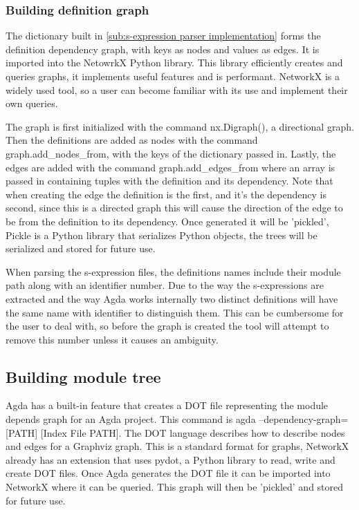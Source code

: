 \subsubsection{Building definition graph}

The dictionary built in \cref{sub:s-expression parser implementation} forms the
definition dependency graph, with keys as nodes and values as edges. It is
imported into the NetowrkX Python library. This library efficiently creates and
queries graphs, it implements useful features and is performant. NetworkX is a
widely used tool, so a user can become familiar with its use and
implement their own queries. 

 The graph is
first initialized with the command \textsf{nx.Digraph()}, a directional graph.
Then the definitions are added as nodes with the command
\textsf{graph.add\_nodes\_from}, with the keys of the dictionary passed in.
Lastly, the edges are added with the command \textsf{graph.add\_edges\_from}
where an array is passed in containing tuples with the definition and its
dependency. Note that when creating the edge the definition is the first, and
it's the dependency is second, since this is a directed graph this will cause
the direction of the edge to be from the definition to its dependency.  Once
generated it will be 'pickled', Pickle is a Python library that serializes Python
objects, the trees will be serialized and stored for future use. 

When parsing the s-expression files, the definitions names include their module
path along with an identifier number. Due to the way the s-expressions are
extracted and the way Agda works internally two distinct definitions will have
the same name with identifier to distinguish them. This can be cumbersome for
the user to deal with, so before the graph is created the tool will attempt to
remove this number unless it causes an ambiguity.

\subsection{Building module tree} \label{sub: Building Module Tree}


Agda has a built-in feature that creates a DOT file representing the
module depends graph for an Agda project. This command is \textsf{agda
--dependency-graph=[PATH] [Index File PATH]}. The DOT language describes how to
describe nodes and edges for a Graphviz graph. This is a standard format for
graphs, NetworkX already has an extension that uses pydot, a Python library to
read, write and create DOT files. Once Agda generates the DOT file it can be
imported into NetworkX where it can be queried. This graph will then be
'pickled' and stored for future use.

